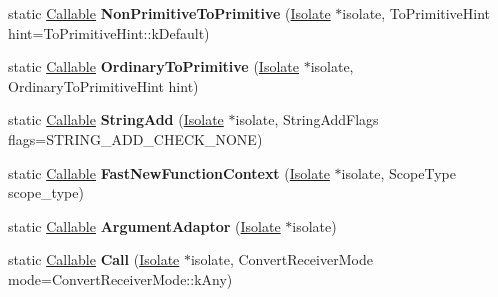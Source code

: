 \begin{DoxyCompactItemize}
\item 
\mbox{\label{classv8_1_1internal_1_1CodeFactory_ad6679f69a09cd1f80186edb6163e7657}} 
static \mbox{\hyperlink{classv8_1_1internal_1_1Callable}{Callable}} {\bfseries Non\+Primitive\+To\+Primitive} (\mbox{\hyperlink{classv8_1_1internal_1_1Isolate}{Isolate}} $\ast$isolate, To\+Primitive\+Hint hint=To\+Primitive\+Hint\+::k\+Default)
\item 
\mbox{\label{classv8_1_1internal_1_1CodeFactory_a9f598848b892dc3efe3745a2a1d23618}} 
static \mbox{\hyperlink{classv8_1_1internal_1_1Callable}{Callable}} {\bfseries Ordinary\+To\+Primitive} (\mbox{\hyperlink{classv8_1_1internal_1_1Isolate}{Isolate}} $\ast$isolate, Ordinary\+To\+Primitive\+Hint hint)
\item 
\mbox{\label{classv8_1_1internal_1_1CodeFactory_a297269d63d28be5ebe680efcac8effa8}} 
static \mbox{\hyperlink{classv8_1_1internal_1_1Callable}{Callable}} {\bfseries String\+Add} (\mbox{\hyperlink{classv8_1_1internal_1_1Isolate}{Isolate}} $\ast$isolate, String\+Add\+Flags flags=S\+T\+R\+I\+N\+G\+\_\+\+A\+D\+D\+\_\+\+C\+H\+E\+C\+K\+\_\+\+N\+O\+NE)
\item 
\mbox{\label{classv8_1_1internal_1_1CodeFactory_ad767e4c0d599a1fcfb281ae51fb11c75}} 
static \mbox{\hyperlink{classv8_1_1internal_1_1Callable}{Callable}} {\bfseries Fast\+New\+Function\+Context} (\mbox{\hyperlink{classv8_1_1internal_1_1Isolate}{Isolate}} $\ast$isolate, Scope\+Type scope\+\_\+type)
\item 
\mbox{\label{classv8_1_1internal_1_1CodeFactory_ab4b1f2ca90d6b333e42fc0a9bb1755df}} 
static \mbox{\hyperlink{classv8_1_1internal_1_1Callable}{Callable}} {\bfseries Argument\+Adaptor} (\mbox{\hyperlink{classv8_1_1internal_1_1Isolate}{Isolate}} $\ast$isolate)
\item 
\mbox{\label{classv8_1_1internal_1_1CodeFactory_ab4d1b10fd3f17e7f8fd0bfa38c1312a0}} 
static \mbox{\hyperlink{classv8_1_1internal_1_1Callable}{Callable}} {\bfseries Call} (\mbox{\hyperlink{classv8_1_1internal_1_1Isolate}{Isolate}} $\ast$isolate, Convert\+Receiver\+Mode mode=Convert\+Receiver\+Mode\+::k\+Any)

\end{DoxyCompactItemize}
